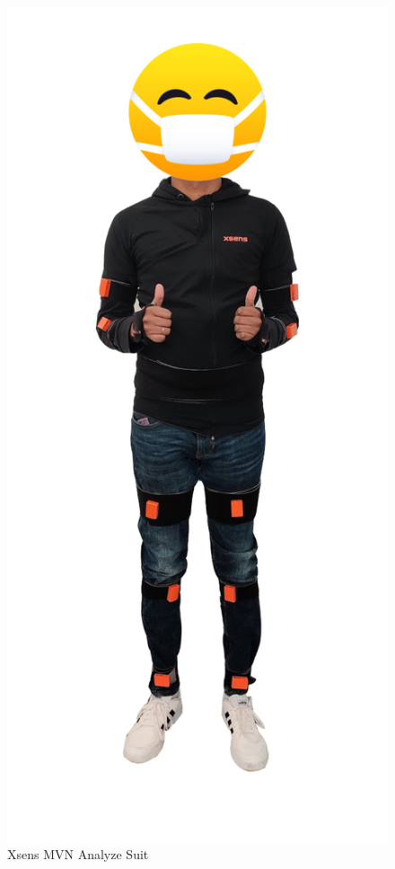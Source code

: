 \begin{figure}[h!]
    \centering
    \includegraphics[scale=0.235]{images/xsens-suit.jpg}\hfill
    \caption{Xsens MVN Analyze Suit}\hfill
    \label{fig: xsens-suit}
\end{figure}

